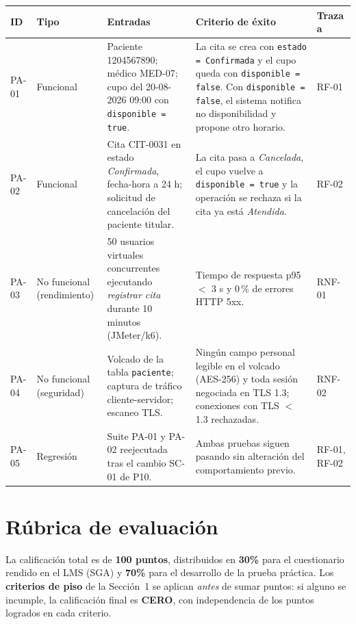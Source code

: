 \documentclass[11pt,a4paper,oneside]{article}
\begin{document}
	{\footnotesize
		\begin{center}
			\begin{tabularx}{\textwidth}{|C{1.2cm}|C{1.8cm}|L{4.0cm}|Y|C{1.3cm}|}
				\hline
				\textbf{ID} & \textbf{Tipo} & \textbf{Entradas} & \textbf{Criterio de éxito} & \textbf{Traza a} \\ \hline
				PA-01 & Funcional & Paciente 1204567890; médico MED-07; cupo del 20-08-2026 09:00 con \texttt{disponible = true}. & La cita se crea con \texttt{estado = Confirmada} y el cupo queda con \texttt{disponible = false}. Con \texttt{disponible = false}, el sistema notifica no disponibilidad y propone otro horario. & RF-01 \\ \hline
				PA-02 & Funcional & Cita CIT-0031 en estado \emph{Confirmada}, fecha-hora a 24 h; solicitud de cancelación del paciente titular. & La cita pasa a \emph{Cancelada}, el cupo vuelve a \texttt{disponible = true} y la operación se rechaza si la cita ya está \emph{Atendida}. & RF-02 \\ \hline
				PA-03 & No funcional (rendimiento) & 50 usuarios virtuales concurrentes ejecutando \emph{registrar cita} durante 10 minutos (JMeter/k6). & Tiempo de respuesta p95 $<$ 3 s y 0\,\% de errores HTTP 5xx. & RNF-01 \\ \hline
				PA-04 & No funcional (seguridad) & Volcado de la tabla \texttt{paciente}; captura de tráfico cliente-servidor; escaneo TLS. & Ningún campo personal legible en el volcado (AES-256) y toda sesión negociada en TLS 1.3; conexiones con TLS $<$ 1.3 rechazadas. & RNF-02 \\ \hline
				PA-05 & Regresión & Suite PA-01 y PA-02 reejecutada tras el cambio SC-01 de P10. & Ambas pruebas siguen pasando sin alteración del comportamiento previo. & RF-01, RF-02 \\ \hline
			\end{tabularx}
	\end{center}}
	
	
	\clearpage
	
	\section{Rúbrica de evaluaci\'on}
	
	La calificaci\'on total es de \textbf{100 puntos}, distribuidos en \textbf{30\%} para el cuestionario rendido en el LMS (SGA) y \textbf{70\%} para el desarrollo de la prueba pr\'actica. Los \textbf{criterios de piso} de la Secci\'on~1 se aplican \emph{antes} de sumar puntos: si alguno se incumple, la calificaci\'on final es \textbf{CERO}, con independencia de los puntos logrados en cada criterio.
	
\end{document}
